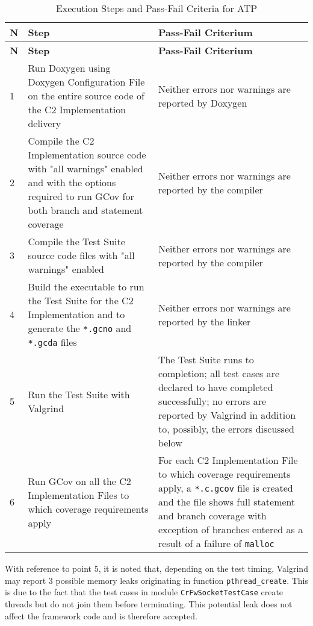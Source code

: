 \documentclass{pnp_article}
\begin{document}
\newpage
\begin{longtable}{|l|p{6.2cm}|p{6.2cm}|}
\caption{Execution Steps and Pass-Fail Criteria for ATP}\label{tab:atp} \\
\hline
\rowcolor{light-gray}
\textbf{N} & \textbf{Step} & \textbf{Pass-Fail Criterium} \\
\hline\hline
\endfirsthead
\rowcolor{light-gray}
\textbf{N} & \textbf{Step} & \textbf{Pass-Fail Criterium} \\
\hline\hline
\endhead

1 & Run Doxygen using Doxygen Configuration File on the entire source code of the C2 Implementation delivery &
Neither errors nor warnings are reported by Doxygen \\
\hline
2 & Compile the C2 Implementation source code with "all warnings" enabled and with the options required to run GCov for both branch and statement coverage &
Neither errors nor warnings are reported by the compiler \\
\hline
3 & Compile the Test Suite source code files with "all warnings" enabled &
Neither errors nor warnings are reported by the compiler \\
\hline
4 & Build the executable to run the Test Suite for the C2 Implementation and to generate the \texttt{*.gcno} and \texttt{*.gcda} files &
Neither errors nor warnings are reported by the linker \\
\hline
5 & Run the Test Suite with Valgrind &
The Test Suite runs to completion; all test cases are declared to have completed successfully; no errors are reported by Valgrind in addition to, possibly, the errors discussed below \\
\hline
6 & Run GCov on all the C2 Implementation Files to which coverage requirements apply &
For each C2 Implementation File to which coverage requirements apply, a \texttt{*.c.gcov}
file is created and the file shows full statement and branch coverage with exception of
branches entered as a result of a failure of \texttt{malloc} \\
\hline
\end{longtable}

With reference to point 5, it is noted that, depending on the test timing, Valgrind may report 3 possible memory leaks originating in function \texttt{pthread\_create}. This is due to the fact that the test cases in module \texttt{CrFwSocketTestCase} create threads but do not join them before terminating. This potential leak does not affect the framework code and is therefore accepted.
\end{document}
